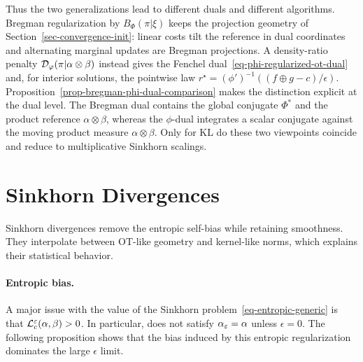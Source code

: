 Thus the two generalizations lead to different duals and different algorithms. Bregman regularization by $B_\Phi(\pi|\xi)$ keeps the projection geometry of Section~\ref{sec-convergence-init}: linear costs tilt the reference in dual coordinates and alternating marginal updates are Bregman projections. A density-ratio penalty $\mathcal{D}_\varphi(\pi|\alpha\otimes\beta)$ instead gives the Fenchel dual~\eqref{eq-phi-regularized-ot-dual} and, for interior solutions, the pointwise law $r^\star=(\phi')^{-1}((f\oplus g-c)/\epsilon)$. Proposition~\ref{prop-bregman-phi-dual-comparison} makes the distinction explicit at the dual level. The Bregman dual contains the global conjugate $\Phi^*$ and the product reference $\alpha\otimes\beta$, whereas the $\phi$-dual integrates a scalar conjugate against the moving product measure $\alpha\otimes\beta$. Only for KL do these two viewpoints coincide and reduce to multiplicative Sinkhorn scalings.


\section{Sinkhorn Divergences}
\label{sec-sinkhorn-div}


Sinkhorn divergences remove the entropic self-bias while retaining smoothness. They interpolate between OT-like geometry and kernel-like norms, which explains their statistical behavior.

\paragraph{Entropic bias.}

A major issue with the value of the Sinkhorn problem~\eqref{eq-entropic-generic} is that $\mathcal{L}_c^\varepsilon(\alpha,\beta)>0$. In particular,
\eq{
	\al_\epsilon = \uargmin{\be} \MK_\c^\epsilon(\al,\be)
}
does not satisfy $\alpha_\varepsilon=\alpha$ unless $\epsilon=0$. The following proposition shows that the bias induced by this entropic regularization dominates the large $\epsilon$ limit.

